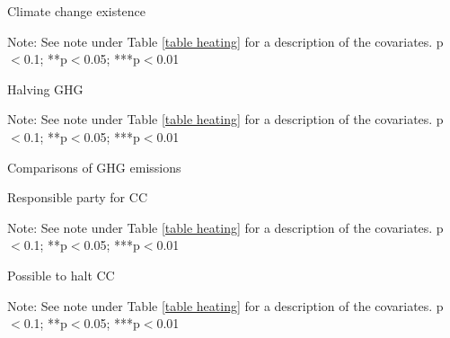 \documentclass{article}
\begin{document}
\begin{table}[h!]
	\caption{Climate change existence}
	\begin{center}
		\scalebox{0.7}{}
	\end{center}
	{\footnotesize Note: See note under Table \ref{table heating} for a description of the covariates.
	\newline *p$<$0.1; **p$<$0.05; ***p$<$0.01}
\end{table}		

\begin{table}[h!]
	\caption{Halving GHG}
	\begin{center}
		\scalebox{0.7}{}
	\end{center}
	{\footnotesize Note: See note under Table \ref{table heating} for a description of the covariates.
	\newline *p$<$0.1; **p$<$0.05; ***p$<$0.01}
\end{table}

\begin{table}[h!]
	\caption{Comparisons of GHG emissions}
	\begin{center}
		\scalebox{0.7}{}
	\end{center}
\end{table}		

\begin{landscape}
	\begin{table}[h!]
		\caption{Responsible party for CC}
		\begin{center}
			\scalebox{0.6}{}
		\end{center}
	{\footnotesize Note: See note under Table \ref{table heating} for a description of the covariates.
	\newline *p$<$0.1; **p$<$0.05; ***p$<$0.01}
	\end{table}		
\end{landscape}

\begin{landscape}
	\begin{table}[h!]
		\caption{Possible to halt CC}
		\begin{center}
			\scalebox{0.6}{}
		\end{center}
	{\footnotesize Note: See note under Table \ref{table heating} for a description of the covariates.
	\newline *p$<$0.1; **p$<$0.05; ***p$<$0.01}
	\end{table}		
\end{landscape}
\end{document}
